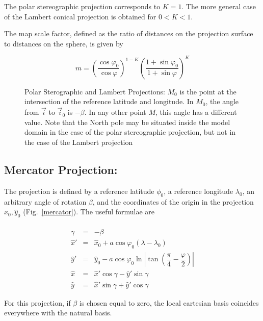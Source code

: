 The polar stereographic projection corresponds to $K=1$. The more general case
of the Lambert conical projection is obtained for $0<K<1$.

The map scale factor, defined as the ratio of distances on the projection
surface to distances on the sphere, is given by

\begin{equation}
m=\left( \dfrac{\cos \varphi _{0}}{\cos \varphi}\right)^{1-K}
\left( \dfrac{1 + \sin\varphi _{0}}{1 + \sin\varphi} \right)^{K}
\end{equation}

\begin{figure}[hpbt]
\caption{Polar Sterographic and Lambert Projections: $M_0$ is the point
at the intersection of the reference latitude and longitude. In $M_0$, the
angle from $\vec{i}$ to $\vec{i}_0$ is $-\beta$. In any other point $M$,
this angle has a different value. Note that the North pole may be situated
inside the model domain in the case of the polar stereographic projection,
but not in the case of the Lambert projection \label{polarstereo}}
\end{figure}

\subsection{Mercator Projection:}

The projection is defined by a reference latitude $\phi_0$, a reference
longitude $\lambda_0$, an arbitrary angle of rotation $\beta$,
and the coordinates of the origin in the projection
$\widehat{x}_0, \widehat{y}_0$ (Fig.~\ref{mercator}). The useful formulae are

\begin{eqnarray}
\nonumber \\ \gamma & = & - \beta \nonumber \\
\widehat{x}' & = & \widehat{x}_0
+ a \cos \varphi _{0}(\lambda - \lambda _{0})  \nonumber \\
\widehat{y}' & = & \widehat{y}_0
 -a\cos\varphi _{0} \ln|\tan(\dfrac{\pi}{4}-\dfrac{\varphi}{2})|  \\
\widehat{x}  & = & \widehat{x}'\cos\gamma - \widehat{y}'\sin\gamma
\nonumber \\
\widehat{y}  & = & \widehat{x}'\sin\gamma + \widehat{y}'\cos\gamma
\nonumber
\end{eqnarray}

For this projection, if $\beta$ is chosen equal to zero, the local
cartesian basis coincides everywhere with the natural basis.

